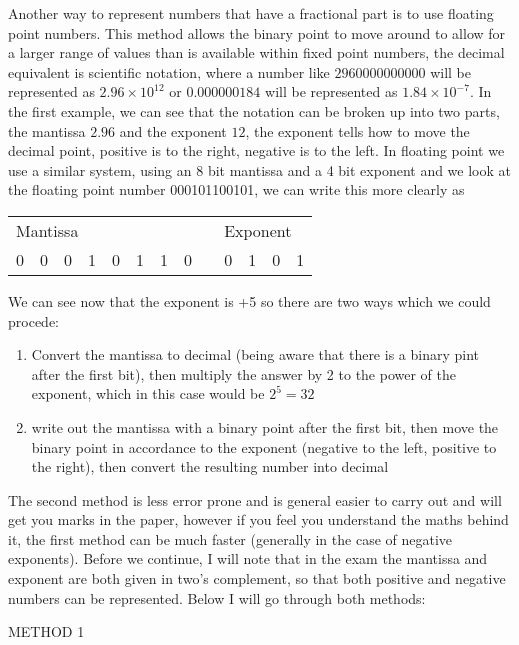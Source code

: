   Another way to represent numbers that have a fractional part is to use floating point numbers. This method allows the binary point to move around to allow for a larger range of values than is available within fixed point numbers, the decimal equivalent is scientific notation, where a number like $2960000000000$ will be represented as $2.96\times10^{12}$ or $0.000000184$ will be represented as $1.84\times10^{-7}$. In the first example, we can see that the notation can be broken up into two parts, the mantissa $2.96$ and the exponent $12$, the exponent tells how to move the decimal point, positive is to the right, negative is to the left. In floating point we use a similar system, using an 8 bit mantissa and a 4 bit exponent and we look at the floating point number 000101100101, we can write this more clearly as
  \begin{table}
  	\begin{tabular}{| c | c | c | c | c | c | c | c | c | c | c | c | c |}
  		\multicolumn{8}{l}{Mantissa} & \multicolumn{1}{l}{} & \multicolumn{4}{l}{Exponent} \\\cline{1-8}\cline{10-13}
  		0 & 0 & 0 & 1 & 0 & 1 & 1 & 0 & & 0 & 1 & 0 & 1 \\ \cline{1-8}\cline{10-13}
  	\end{tabular}
  \end{table}
  We can see now that the exponent is +5 so there are two ways which we could procede:
  \begin{enumerate}
  	\item Convert the mantissa to decimal (being aware that there is a binary pint after the first bit), then multiply the answer by 2 to the power of the exponent, which in this case would be $2^5=32$
  	\item write out the mantissa with a binary point after the first bit, then move the binary point in accordance to the exponent (negative to the left, positive to the right), then convert the resulting number into decimal
  \end{enumerate}
  The second method is less error prone and is general easier to carry out and will get you marks in the paper, however if you feel you understand the maths behind it, the first method can be much faster (generally in the case of negative exponents). Before we continue, I will note that in the exam the mantissa and exponent are both given in two's complement, so that both positive and negative numbers can be represented. Below I will go through both methods:
  
  
  METHOD 1
  
